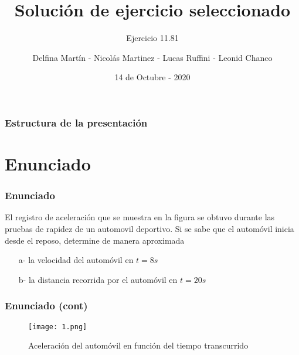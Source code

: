 \documentclass[11pt]{beamer}
\begin{document}
	\author{\small{Delfina Martín - Nicolás Martinez - Lucas Ruffini - Leonid Chanco}}
	\title{Solución de ejercicio seleccionado}
	\subtitle{Ejercicio 11.81}
	\date{14 de Octubre - 2020}
	
	
	\begin{frame}[plain]
		\maketitle
	\end{frame}

	\begin{frame}
		\frametitle{Estructura de la presentación}
		\tableofcontents
	\end{frame}
	
	\section{Enunciado}	
	\begin{frame}
		\frametitle{Enunciado}
		El registro de aceleración que se muestra en la figura se obtuvo durante las pruebas de rapidez de un automovil deportivo. Si se sabe que el automóvil inicia desde el reposo, determine de manera aproximada \pause
		
		\begin{itemize}
			\item[a-] la velocidad del automóvil en $t = 8s$ \pause
			\item[b-] la distancia recorrida por el automóvil en $t = 20s$
		\end{itemize}
	\end{frame}

	\begin{frame}
		\frametitle{Enunciado (cont)}
		
		\begin{figure}[H]
			\centering
			\texttt{[image: 1.png]}
			\caption{Aceleración del automóvil en función del tiempo transcurrido}
			\label{fig:AcAutomovil}
		\end{figure}
	\end{frame}
\end{document}

